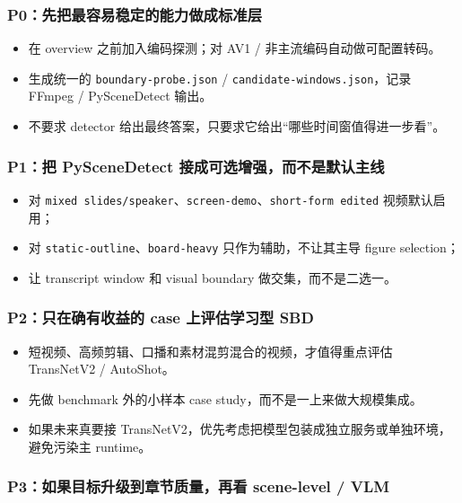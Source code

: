 \documentclass[a4paper]{article}
\begin{document}
\subsubsection{P0：先把最容易稳定的能力做成标准层}

\begin{itemize}
\item 在 overview 之前加入编码探测；对 AV1 / 非主流编码自动做可配置转码。
\item 生成统一的 \texttt{boundary-probe.json} / \texttt{candidate-windows.json}，记录 FFmpeg / PySceneDetect 输出。
\item 不要求 detector 给出最终答案，只要求它给出“哪些时间窗值得进一步看”。
\end{itemize}

\subsubsection{P1：把 PySceneDetect 接成可选增强，而不是默认主线}

\begin{itemize}
\item 对 \texttt{mixed slides/speaker}、\texttt{screen-demo}、\texttt{short-form edited} 视频默认启用；
\item 对 \texttt{static-outline}、\texttt{board-heavy} 只作为辅助，不让其主导 figure selection；
\item 让 transcript window 和 visual boundary 做交集，而不是二选一。
\end{itemize}

\subsubsection{P2：只在确有收益的 case 上评估学习型 SBD}

\begin{itemize}
\item 短视频、高频剪辑、口播和素材混剪混合的视频，才值得重点评估 TransNetV2 / AutoShot。
\item 先做 benchmark 外的小样本 case study，而不是一上来做大规模集成。
\item 如果未来真要接 TransNetV2，优先考虑把模型包装成独立服务或单独环境，避免污染主 runtime。
\end{itemize}

\subsubsection{P3：如果目标升级到章节质量，再看 scene-level / VLM}
\end{document}
